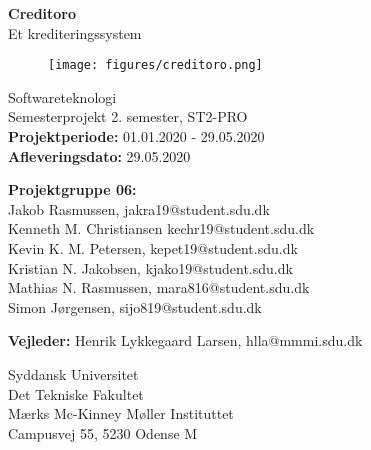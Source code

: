 \begin{titlepage}
\begin{center}
{ \LARGE \bfseries Creditoro \\[0.4cm]}
Et krediteringssystem
\begin{figure}[H]
\centering 
\texttt{[image: figures/creditoro.png]}
\end{figure}

Softwareteknologi\\
\vspace{2mm}
Semesterprojekt 2. semester, ST2-PRO\\
\vspace{2mm}
\textbf{Projektperiode:} 01.01.2020 - 29.05.2020 \\
\vspace{2mm}
\textbf{Afleveringsdato:} 29.05.2020 \\

\vspace{7mm}

\textbf{Projektgruppe 06:} \\
\vspace{2mm}
Jakob Rasmussen, jakra19@student.sdu.dk \\
\vspace{2mm}
Kenneth M. Christiansen kechr19@student.sdu.dk \\
\vspace{2mm}
Kevin K. M. Petersen, kepet19@student.sdu.dk \\
\vspace{2mm}
Kristian N. Jakobsen, kjako19@student.sdu.dk \\
\vspace{2mm}
Mathias N. Rasmussen, mara816@student.sdu.dk \\
\vspace{2mm}
Simon Jørgensen, sijo819@student.sdu.dk \\

\vspace{7mm}

\textbf{Vejleder:} Henrik Lykkegaard Larsen, hlla@mmmi.sdu.dk \\

\vfill

Syddansk Universitet\\
Det Tekniske Fakultet\\
Mærks Mc-Kinney Møller Instituttet\\
Campusvej 55, 5230 Odense M

\end{center}
\end{titlepage}